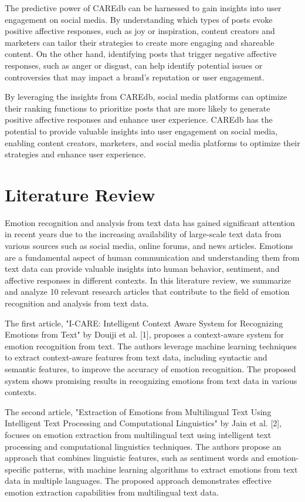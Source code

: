 \documentclass[conference]{IEEEtran}
\begin{document}
The predictive power of CAREdb can be harnessed to gain insights into user engagement on social media. By understanding which types of posts evoke positive affective responses, such as joy or inspiration, content creators and marketers can tailor their strategies to create more engaging and shareable content. On the other hand, identifying posts that trigger negative affective responses, such as anger or disgust, can help identify potential issues or controversies that may impact a brand's reputation or user engagement.

By leveraging the insights from CAREdb, social media platforms can optimize their ranking functions to prioritize posts that are more likely to generate positive affective responses and enhance user experience. CAREdb has the potential to provide valuable insights into user engagement on social media, enabling content creators, marketers, and social media platforms to optimize their strategies and enhance user experience.

\section{Literature Review}

Emotion recognition and analysis from text data has gained significant attention in recent years due to the increasing availability of large-scale text data from various sources such as social media, online forums, and news articles. Emotions are a fundamental aspect of human communication and understanding them from text data can provide valuable insights into human behavior, sentiment, and affective responses in different contexts. In this literature review, we summarize and analyze 10 relevant research articles that contribute to the field of emotion recognition and analysis from text data.

The first article, "I-CARE: Intelligent Context Aware System for Recognizing Emotions from Text" by Douiji et al. [1], proposes a context-aware system for emotion recognition from text. The authors leverage machine learning techniques to extract context-aware features from text data, including syntactic and semantic features, to improve the accuracy of emotion recognition. The proposed system shows promising results in recognizing emotions from text data in various contexts.

The second article, "Extraction of Emotions from Multilingual Text Using Intelligent Text Processing and Computational Linguistics" by Jain et al. [2], focuses on emotion extraction from multilingual text using intelligent text processing and computational linguistics techniques. The authors propose an approach that combines linguistic features, such as sentiment words and emotion-specific patterns, with machine learning algorithms to extract emotions from text data in multiple languages. The proposed approach demonstrates effective emotion extraction capabilities from multilingual text data.
\end{document}
